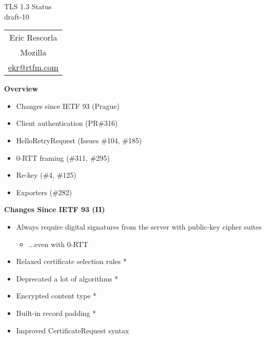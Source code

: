 \documentclass[helvetica]{seminar}
\newcommand{\heading}[1]{%
  \begin{center} 
    \large\bf 
    #1 
  \end{center} 
  \vspace{.4 in}}
\begin{document}
\begin{slide}
\begin{center}
\vspace{.5 in}
\LARGE{{\bf}TLS 1.3 Status\\draft-10}\\
\vspace{.2in}
\large{
\begin{tabular}{c}
Eric Rescorla\\
Mozilla\\
\url{ekr@rtfm.com}
\end{tabular}
}
\end{center}

\end{slide}

\centerslidesfalse 


\begin{slide}
\heading{Overview}

\begin{itemize}
\item Changes since IETF 93 (Prague)
\item Client authentication (PR\#316)
\item HelloRetryRequest (Issues \#104, \#185)
\item 0-RTT framing (\#311, \#295)
\item Re-key (\#4, \#125)
\item Exporters (\#282)
\end{itemize}

\end{slide}

\begin{slide}
\heading{Changes Since IETF 93 (II)}

\begin{itemize}
\item Always require digital signatures from the server with public-key cipher suites
  \begin{itemize}
  \item ...even with 0-RTT
  \end{itemize}

\item Relaxed certificate selection rules *
\item Deprecated a lot of algorithms *
\item Encrypted content type *
\item Built-in record padding *
\item Improved CertificateRequest syntax
\end{itemize}
\end{slide}
\end{document}
